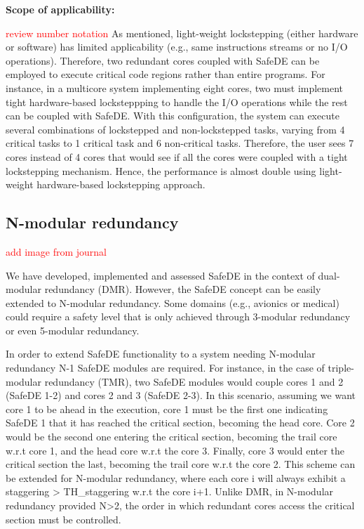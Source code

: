 \textbf{Scope of applicability:}

\textcolor{red}{review number notation}
As mentioned, light-weight lockstepping (either hardware or software) has limited applicability (e.g., same instructions streams or no I/O operations). Therefore, two redundant cores coupled with SafeDE can be employed to execute critical code regions rather than entire programs. For instance, in a multicore system implementing eight cores, two must implement tight hardware-based locksteppping to handle the I/O operations while the rest can be coupled with SafeDE. With this configuration, the system can execute several combinations of lockstepped and non-lockstepped tasks, varying from 4 critical tasks to 1 critical task and 6 non-critical tasks. Therefore, the user sees 7 cores instead of 4 cores that would see if all the cores were coupled with a tight lockstepping mechanism. Hence, the performance is almost double using light-weight hardware-based lockstepping approach.

\bigskip




\subsection{N-modular redundancy}
\textcolor{red}{add image from journal}

We have developed, implemented and assessed SafeDE in the context of dual-modular redundancy (DMR). However, the SafeDE concept can be easily extended to N-modular redundancy. Some domains (e.g., avionics or medical) could require a safety level that is only achieved through 3-modular redundancy or even 5-modular redundancy. 

In order to extend SafeDE functionality to a system needing N-modular redundancy N-1 SafeDE modules are required. For instance, in the case of triple-modular redundancy (TMR), two SafeDE modules would couple cores 1 and 2 (SafeDE 1-2) and cores 2 and 3 (SafeDE 2-3). In this scenario, assuming we want core 1 to be ahead in the execution, core 1 must be the first one indicating SafeDE 1 that it has reached the critical section, becoming the head core. Core 2 would be the second one entering the critical section, becoming the trail core w.r.t core 1, and the head core w.r.t the core 3. Finally, core 3 would enter the critical section the last, becoming the trail core w.r.t the core 2. This scheme can be extended for  N-modular redundancy, where each core i will always exhibit a staggering > TH\_staggering w.r.t the core i+1. Unlike DMR, in N-modular redundancy provided N>2, the order in which redundant cores access the critical section must be controlled.  

